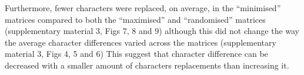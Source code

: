 \documentclass[12pt,letterpaper]{article}
\begin{document}
Furthermore, fewer characters were replaced, on average, in the ``minimised'' matrices compared to both the ``maximised'' and ``randomised'' matrices (supplementary material 3, Figs 7, 8 and 9) although this did not change the way the average character differences varied across the matrices (supplementary material 3, Figs 4, 5 and 6)%
This suggest that character difference can be decreased with a smaller amount of characters replacements than increasing it.
\end{document}
